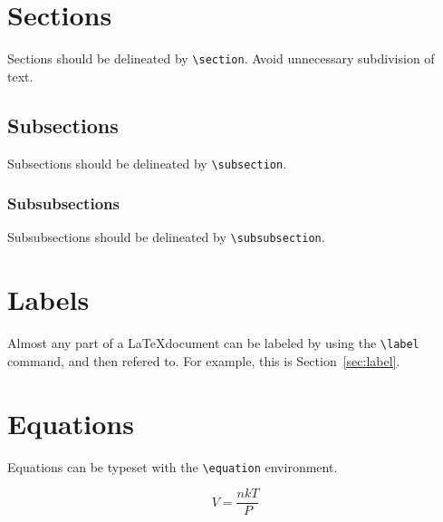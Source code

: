 \documentclass[12pt]{iopart}
\begin{document}





\begin{abstract}
The abstract goes here, ensuring that the environment is opened and closed with \texttt{abstract}.

\end{abstract}

\section{Sections}

Sections should be delineated by \texttt{\textbackslash section}. Avoid unnecessary subdivision of text.

\subsection{Subsections}

Subsections should be delineated by \texttt{\textbackslash subsection}.

\subsubsection{Subsubsections}

Subsubsections should be delineated by \texttt{\textbackslash subsubsection}.

\section{Labels \label{sec:label}}

Almost any part of a \LaTeX document can be labeled by using the \texttt{\textbackslash label} command, and then refered to. For example, this is Section~\ref{sec:label}.

\section{Equations}

Equations can be typeset with the \texttt{\textbackslash equation} environment.

\begin{equation}
V=\frac{nkT}{P}
\label{eq:gaslaw}
\end{equation}
\end{document}
